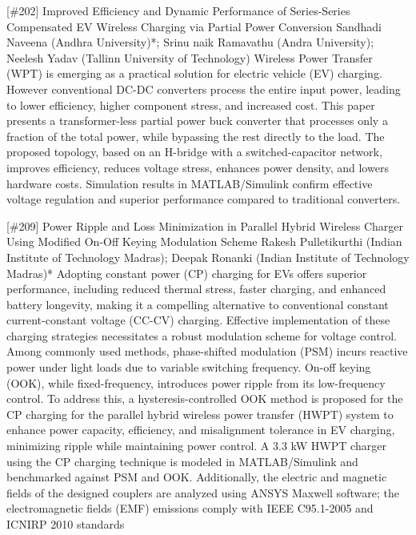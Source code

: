 {} \begin{abstract_online} {[\#202] Improved Efficiency and Dynamic Performance of Series-Series Compensated EV Wireless Charging via Partial Power Conversion} {} {Sandhadi Naveena (Andhra University)*; Srinu naik Ramavathu (Andra University); Neelesh Yadav (Tallinn University of Technology)} {} Wireless Power Transfer (WPT) is emerging as a practical solution for electric vehicle (EV) charging. However conventional DC-DC converters process the entire input power, leading to lower efficiency, higher component stress, and increased cost. This paper presents a transformer-less partial power buck converter that processes only a fraction of the total power, while bypassing the rest directly to the load. The proposed topology, based on an H-bridge with a switched-capacitor network, improves efficiency, reduces voltage stress, enhances power density, and lowers hardware costs. Simulation results in MATLAB/Simulink confirm effective voltage regulation and superior performance compared to traditional converters. \end{abstract_online} 
{} \begin{abstract_online} {[\#209] Power Ripple and Loss Minimization in Parallel Hybrid Wireless Charger Using Modified On-Off Keying Modulation Scheme} {} {Rakesh  Pulletikurthi (Indian Institute of Technology Madras); Deepak  Ronanki (Indian Institute of Technology Madras)*} {} Adopting constant power (CP) charging for EVs offers superior performance, including reduced thermal stress, faster charging, and enhanced battery longevity, making it a compelling alternative to conventional constant current-constant voltage (CC-CV) charging. Effective implementation of these charging strategies necessitates a robust modulation scheme for voltage control. Among commonly used methods, phase-shifted modulation (PSM) incurs reactive power under light loads due to variable switching frequency. On-off keying (OOK), while fixed-frequency, introduces power ripple from its low-frequency control. To address this, a hysteresis-controlled OOK method is proposed for the CP charging for the parallel hybrid wireless power transfer (HWPT) system to enhance power capacity, efficiency, and misalignment tolerance in EV charging, minimizing ripple while maintaining power control. A 3.3 kW HWPT charger using the CP charging technique is modeled in MATLAB/Simulink and benchmarked against PSM and OOK. Additionally, the electric and magnetic fields of the designed couplers are analyzed using ANSYS Maxwell software; the electromagnetic fields (EMF) emissions comply with IEEE C95.1-2005 and ICNIRP 2010 standards \end{abstract_online} 
